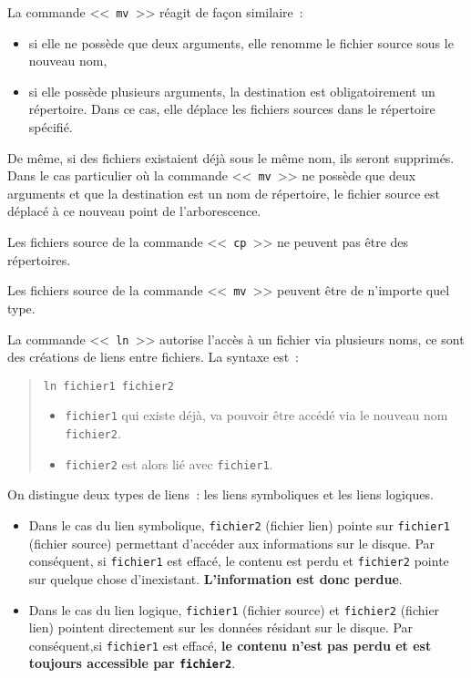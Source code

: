 La commande <<~{\tt mv}~>> r{\'e}agit de fa\c{c}on similaire~:
\begin{itemize}
	\item	si elle ne poss{\`e}de que deux arguments, elle renomme le fichier
			source sous le nouveau nom,
	\item	si elle poss{\`e}de plusieurs arguments, la destination est
			obligatoirement un r{\'e}pertoire. Dans ce cas, elle d{\'e}place les
			fichiers sources dans le r{\'e}pertoire sp{\'e}cifi{\'e}.
\end{itemize}

De m{\^e}me, si des fichiers existaient d{\'e}j{\`a} sous le m{\^e}me nom, ils seront
supprim{\'e}s. Dans le cas particulier o{\`u} la commande <<~{\tt mv}~>> ne
poss{\`e}de que deux arguments et que la destination est un nom de
r{\'e}pertoire, le fichier source est d{\'e}plac{\'e} {\`a} ce nouveau point de
l'arborescence.

Les fichiers source de la commande <<~{\tt cp}~>> ne peuvent pas {\^e}tre des
r{\'e}pertoires.

Les fichiers source de la commande <<~{\tt mv}~>> peuvent {\^e}tre de
n'importe quel type.

La commande <<~{\tt ln}~>> autorise l'acc{\`e}s
{\`a} un fichier via plusieurs noms, ce sont des cr{\'e}ations de liens
entre fichiers. La syntaxe est~:
\begin{quote}
\begin{center}
{\tt ln fichier1 fichier2}
\end{center}
\begin{itemize}
	\item {\tt fichier1} qui existe d{\'e}j{\`a}, va pouvoir {\^e}tre acc{\'e}d{\'e} via
		le nouveau nom {\tt fichier2}.
	\item {\tt fichier2} est alors li{\'e} avec {\tt fichier1}.
\end{itemize}
\end{quote}

On distingue deux types de liens~: les liens symboliques et les liens logiques.

\begin{itemize}
	\item	{}Dans le cas du lien symbolique, {\tt fichier2} (fichier lien)
			pointe sur {\tt fichier1} (fichier source) permettant d'acc{\'e}der
			aux informations sur le disque. Par cons{\'e}quent, si {\tt fichier1}
			est effac{\'e}, le contenu est perdu et {\tt fichier2} pointe
			sur quelque chose d'inexistant. {\bf L'information est donc perdue}.\\
	\item	{}Dans le cas du lien logique, {\tt fichier1} (fichier source) et
			{\tt fichier2} (fichier lien) pointent directement sur les donn{\'e}es
			r{\'e}sidant sur le disque. Par cons{\'e}quent,si {\tt fichier1} est effac{\'e},
			{\bf le contenu n'est pas perdu et est toujours accessible par
			{\tt fichier2}}.
\end{itemize}

